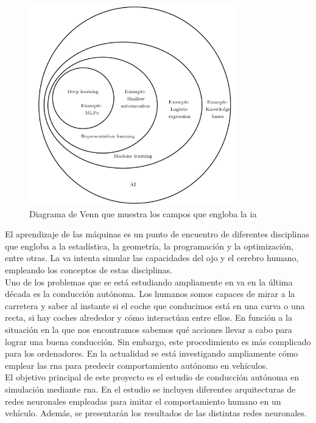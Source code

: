 \begin{figure}[H]
  \begin{center}
    \includegraphics[width=0.8\textwidth]{figures/Introduccion/venn.png}
		\caption{Diagrama de Venn que muestra los campos que engloba la \acrshort{ia}}
		\label{fig.ia}
		\end{center}
\end{figure}

El aprendizaje de las máquinas es un punto de encuentro de diferentes disciplinas que engloba a la estadística, la geometría, la programación y la optimización, entre otras. La \acrshort{va} intenta simular las capacidades del ojo y el cerebro humano, empleando los conceptos de estas disciplinas.\\

Uno de los problemas que se está estudiando ampliamente en \acrshort{va} en la última década es la conducción autónoma. Los humanos somos capaces de mirar a la carretera y saber al instante si el coche que conducimos está en una curva o una recta, si hay coches alrededor y cómo interactúan entre ellos. En función a la situación en la que nos encontramos sabemos qué acciones llevar a cabo para lograr una buena conducción.  Sin embargo, este procedimiento es más complicado para los ordenadores. En la actualidad se está investigando ampliamente cómo emplear las \acrfull{rna} para predecir comportamiento autónomo en vehículos.\\

El objetivo principal de este proyecto es el estudio de conducción autónoma en simulación mediante \acrfull{rna}. En el estudio se incluyen diferentes arquitecturas de redes neuronales empleadas para imitar el comportamiento humano en un vehículo. Además, se presentarán los resultados de las distintas redes neuronales.


